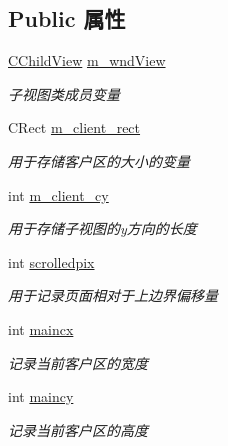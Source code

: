 \subsection*{Public 属性}
\begin{DoxyCompactItemize}
\item 
\mbox{\label{class_c_main_frame_a7c3af9327c496f8c807d578f7a4ef4c5}} 
\hyperlink{class_c_child_view}{C\+Child\+View} \hyperlink{class_c_main_frame_a7c3af9327c496f8c807d578f7a4ef4c5}{m\+\_\+wnd\+View}
\begin{DoxyCompactList}\small\item\em 子视图类成员变量 \end{DoxyCompactList}\item 
\mbox{\label{class_c_main_frame_a0c53b2f10889123e0c4cf8912816aeaf}} 
C\+Rect \hyperlink{class_c_main_frame_a0c53b2f10889123e0c4cf8912816aeaf}{m\+\_\+client\+\_\+rect}
\begin{DoxyCompactList}\small\item\em 用于存储客户区的大小的变量 \end{DoxyCompactList}\item 
\mbox{\label{class_c_main_frame_ad561552de446751652ae4e98ded06589}} 
int \hyperlink{class_c_main_frame_ad561552de446751652ae4e98ded06589}{m\+\_\+client\+\_\+cy}
\begin{DoxyCompactList}\small\item\em 用于存储子视图的y方向的长度 \end{DoxyCompactList}\item 
\mbox{\label{class_c_main_frame_a342befca89935d78753d6a78514b83c5}} 
int \hyperlink{class_c_main_frame_a342befca89935d78753d6a78514b83c5}{scrolledpix}
\begin{DoxyCompactList}\small\item\em 用于记录页面相对于上边界偏移量 \end{DoxyCompactList}\item 
\mbox{\label{class_c_main_frame_a94f2543f4d46fdb15202c5386ef4ee0a}} 
int \hyperlink{class_c_main_frame_a94f2543f4d46fdb15202c5386ef4ee0a}{maincx}
\begin{DoxyCompactList}\small\item\em 记录当前客户区的宽度 \end{DoxyCompactList}\item 
\mbox{\label{class_c_main_frame_abfc6b521bf0730404603a66171e51159}} 
int \hyperlink{class_c_main_frame_abfc6b521bf0730404603a66171e51159}{maincy}
\begin{DoxyCompactList}\small\item\em 记录当前客户区的高度 \end{DoxyCompactList}\end{DoxyCompactItemize}
